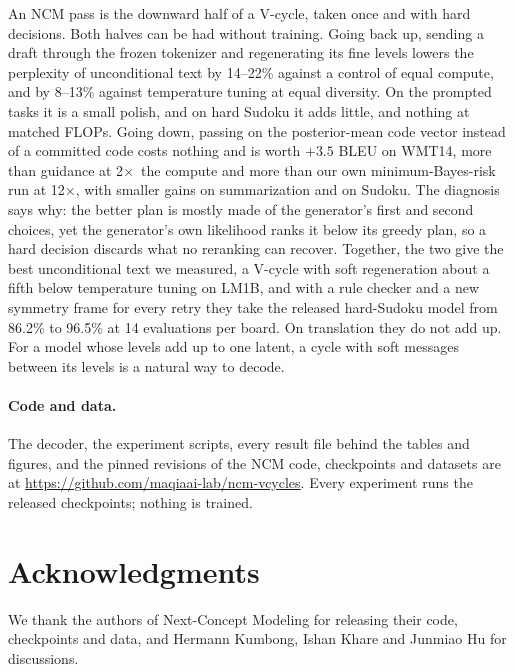 \documentclass[11pt]{article}
\newcommand{\x}{$\times$}
\begin{document}
An NCM pass is the downward half of a V-cycle, taken once and with hard decisions. Both halves can be had without
training. Going back up, sending a draft through the frozen tokenizer and regenerating its fine levels lowers the
perplexity of unconditional text by 14--22\% against a control of equal compute, and by 8--13\% against temperature
tuning at equal diversity. On the prompted tasks it is a small polish, and on hard Sudoku it adds little, and nothing
at matched FLOPs. Going down, passing on the posterior-mean code vector instead of a committed code costs nothing and
is worth $+3.5$ BLEU on WMT14, more than guidance at 2\x\ the compute and more than our own minimum-Bayes-risk run at
12\x, with smaller gains on summarization and on Sudoku. The diagnosis says why: the better plan is mostly made of the
generator's first and second choices, yet the generator's own likelihood ranks it below its greedy plan, so a hard
decision discards what no reranking can recover. Together, the two give the best unconditional text we measured, a
V-cycle with soft regeneration about a fifth below temperature tuning on LM1B, and with a rule checker and a new
symmetry frame for every retry they take the released hard-Sudoku model from 86.2\% to 96.5\% at 14 evaluations per
board. On translation they do not add up. For a model whose levels add up to one latent, a cycle with soft messages
between its levels is a natural way to decode.

\paragraph{Code and data.} The decoder, the experiment scripts, every result file behind the tables and figures, and
the pinned revisions of the NCM code, checkpoints and datasets are at
\url{https://github.com/maqiaai-lab/ncm-vcycles}. Every experiment runs the released checkpoints; nothing is
trained.

\section*{Acknowledgments}
We thank the authors of Next-Concept Modeling for releasing their code, checkpoints and
data, and Hermann Kumbong, Ishan Khare and Junmiao Hu for discussions.

\clearpage



\clearpage
\appendix

\end{document}
